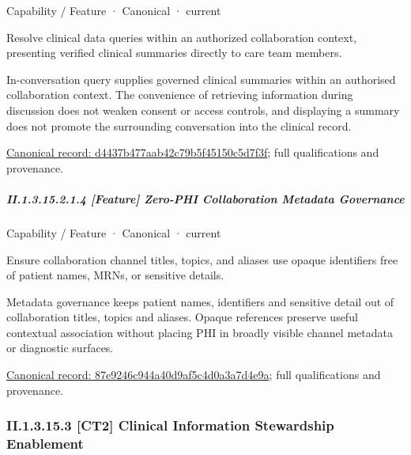\label{element:d4437b477aab42c79b5f45150c5d7f3f}
{\small Capability / Feature · Canonical · current}\par

Resolve clinical data queries within an authorized collaboration context, presenting verified clinical summaries directly to care team members.



In-conversation query supplies governed clinical summaries within an authorised collaboration context. The convenience of retrieving information during discussion does not weaken consent or access controls, and displaying a summary does not promote the surrounding conversation into the clinical record.


{\footnotesize \href{../../../../continuum/strategy/capability/feature/d4437b477aab42c79b5f45150c5d7f3f.md}{Canonical record: d4437b477aab42c79b5f45150c5d7f3f}; full qualifications and provenance.}\par
\subparagraph*{II.1.3.15.2.1.4 [Feature] Zero-PHI Collaboration Metadata Governance}
\label{navigation:II.1.3.15.2.1.4}

\label{element:87e9246c944a40d9af5c4d0a3a7d4e9a}
{\small Capability / Feature · Canonical · current}\par

Ensure collaboration channel titles, topics, and aliases use opaque identifiers free of patient names, MRNs, or sensitive details.



Metadata governance keeps patient names, identifiers and sensitive detail out of collaboration titles, topics and aliases. Opaque references preserve useful contextual association without placing PHI in broadly visible channel metadata or diagnostic surfaces.


{\footnotesize \href{../../../../continuum/strategy/capability/feature/87e9246c944a40d9af5c4d0a3a7d4e9a.md}{Canonical record: 87e9246c944a40d9af5c4d0a3a7d4e9a}; full qualifications and provenance.}\par
\subsubsection*{II.1.3.15.3 [CT2] Clinical Information Stewardship Enablement}
\label{navigation:II.1.3.15.3}

